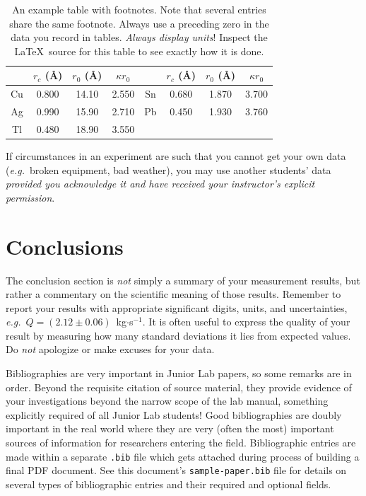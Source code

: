 \begin{table}[h]
\caption{\label{tab:table1}An example table with footnotes.  Note
that several entries share the same footnote. Always use a preceding
zero in the data you record in tables.  \emph{Always display units}!
 Inspect the \LaTeX\ source for this table to see exactly how it is
done.}
\begin{ruledtabular}
\begin{tabular}{cccccccc}
 &$r_c$ (\AA) &$r_0$ (\AA)&$\kappa r_0$&
 &$r_c$ (\AA) &$r_0$ (\AA)&$\kappa r_0$\\
\hline
Cu& 0.800 & 14.10 & 2.550 &Sn\footnotemark[1] & 0.680 & 1.870 & 3.700 \\
Ag& 0.990 & 15.90 & 2.710 &Pb\footnotemark[1] & 0.450 & 1.930 & 3.760 \\
Tl& 0.480 & 18.90 & 3.550 & & & & \\
\end{tabular}
\end{ruledtabular}
\end{table}

If circumstances in an experiment are such that you cannot get your
own data (\textit{e.g.}\ broken equipment, bad weather), you may use another 
students' data \emph{provided you acknowledge it \emph{and} have received 
your instructor's explicit permission}.


\section{Conclusions}

The conclusion section is \emph{not} simply a summary of your measurement 
results, but rather a commentary on the scientific meaning of those results.
 Remember to report your results with
appropriate significant digits, units, and uncertainties, \textit{e.g.}\ 
$Q = (2.12 \pm 0.06)$~kg$\cdot$s$^{-1}$.  It is often useful
to express the quality of your result by measuring how many standard
deviations it lies from expected values. 
Do \emph{not} apologize or make 
excuses for your data.%

Bibliographies are very important in Junior Lab papers, so some remarks 
are in order.  Beyond the
requisite citation of source material, they provide evidence of your
investigations beyond the narrow scope of the lab manual, something
explicitly required of all Junior Lab students!  Good bibliographies
are doubly important in the real world where they are very (often
the most) important sources of information for researchers entering
the field.  Bibliographic entries are made within a separate \texttt{.bib}
file which gets attached during process of building a final PDF
document.  See this document's \texttt{sample-paper.bib} file for details
on several types of bibliographic entries and their required and
optional fields.

